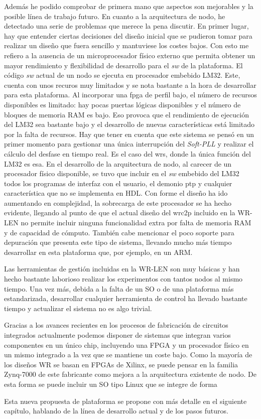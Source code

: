 Además he podido comprobar de primera mano que aspectos son mejorables y la 
posible línea de trabajo futuro. En cuanto a la arquitectura de nodo, he 
detectado una serie de problemas que merece la pena discutir. En primer lugar, 
hay que entender ciertas decisiones del diseño inicial que se pudieron tomar 
para realizar un diseño que fuera sencillo y mantuviese los costes bajos. Con 
esto me refiero a la ausencia de un microprocesador físico externo que permita 
obtener un mayor rendimiento y flexibilidad de desarrollo para el \textit{sw} 
de la plataforma. El código \textit{sw} actual de un nodo se ejecuta en 
procesador embebido LM32. Este, cuenta con unos recuros muy limitados y se nota 
bastante a la hora de desarrollar para esta plataforma. Al incorporar una 
\gls{fpga} de perfil bajo, el número de recursos disponibles es limitado: hay 
pocas puertas lógicas disponibles y el número de bloques de memoria RAM es 
bajo. Eso provoca que el rendimiento de ejecución del LM32 sea bastante bajo y 
el desarrollo de nuevas características está limitado por la falta de recursos. 
Hay que tener en cuenta que este sistema se pensó en un primer momento para 
gestionar una única interrupción del \textit{Soft-PLL} y realizar el cálculo 
del desfase en tiempo real. Es el caso del \gls{wrs}, donde la única función 
del LM32 es esa. En el desarrollo de la arquitectura de nodo, al carecer de un 
procesador físico disponible, se tuvo que incluir en el \textit{sw} embebido 
del LM32 todos los programas de interfaz con el usuario, el demonio \gls{ptp} y 
cualquier característica que no se implementa en HDL. Con forme el diseño ha 
ido aumentando en complejidad, la sobrecarga de este procesador se ha hecho 
evidente, llegando al punto de que el actual diseño del \gls{wrc2p} incluido en 
la WR-LEN no permite incluir ninguna funcionalidad extra por falta de memoria 
RAM y de capacidad de cómputo. También cabe mencionar el poco soporte para 
depuración que presenta este tipo de sistema, llevando mucho más tiempo 
desarrollar en esta plataforma que, por ejemplo, en un ARM.

Las herramientas de gestión incluidas en la WR-LEN son muy básicas y han hecho 
bastante laborioso realizar los experimentos con tantos nodos al mismo tiempo. 
Una vez más, debida a la falta de un SO o de una plataforma más estandarizada, 
desarrollar cualquier herramienta de control ha llevado bastante tiempo y 
actualizar el sistema no es algo trivial. 

Gracias a los avances recientes en los procesos de fabricación de circuitos 
integrados actualmente podemos disponer de sistemas que integran varios 
componentes en un único chip, incluyendo una FPGA y un procesador físico en un 
mismo integrado a la vez que se mantiene un coste bajo. Como la mayoría de los 
diseños WR se basan en FPGAs de Xilinx, se puede pensar en la familia Zynq-7000 
de este fabricante como mejora a la arquitectura existente de nodo. De esta 
forma se puede incluir un SO tipo Linux que se integre de forma 

Esta nueva propuesta de plataforma se propone con más detalle en el siguiente 
capítulo, hablando de la línea de desarrollo actual y de los pasos futuros.


